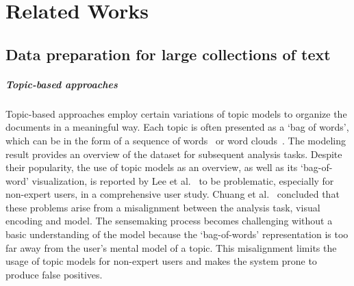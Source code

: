 \section{Related Works}
\subsection{Data preparation for large collections of text}
\subparagraph{Topic-based approaches} 
Topic-based approaches employ certain variations of topic models to organize the documents in a meaningful way.
Each topic is often presented as a `bag of words', which can be in the form of a sequence of words~\cite{yang2017vistopic, cho2016vairoma, dou2013hierarchicaltopics,yan2019clfsemi,han2022hisva, alexander2014serendip, lee2012ivisclustering} or word clouds~\cite{oelke2014topiccoin, cho2016vairoma}.
The modeling result provides an overview of the dataset for subsequent analysis tasks. 
Despite their popularity, the use of topic models as an overview, as well as its `bag-of-word' visualization, is reported by Lee et al.~\cite{lee2017humantopicmodel} to be problematic, especially for non-expert users, in a comprehensive user study.
Chuang et al.~\cite{chuang2012interpretation} concluded that these problems arise from a misalignment between the analysis task, visual encoding and model.
The sensemaking process becomes challenging without a basic understanding of the model because the `bag-of-words' representation is too far away from the user's mental model of a topic.
This misalignment limits the usage of topic models for non-expert users and makes the system prone to produce false positives.

